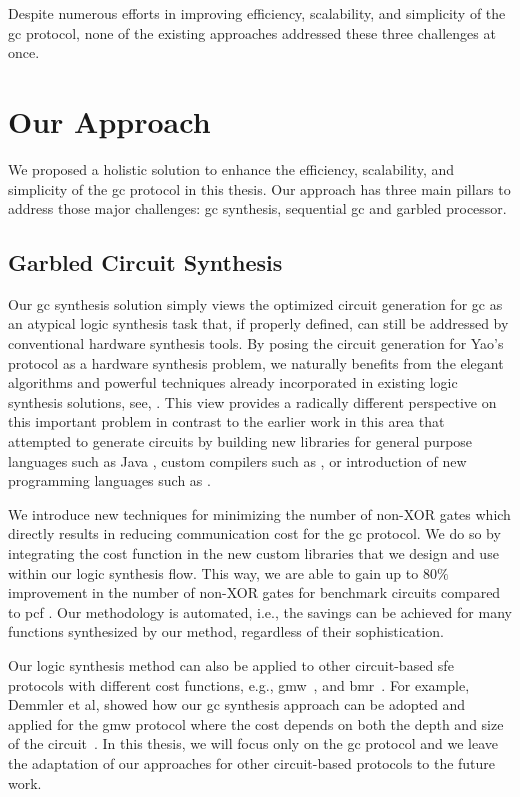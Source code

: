 Despite numerous efforts in improving efficiency, scalability, and simplicity of the \acrshort{gc} protocol, none of the existing approaches addressed these three challenges at once.

\section{Our Approach}
We proposed a holistic solution to enhance the efficiency, scalability, and simplicity of the \acrshort{gc} protocol in this thesis.
Our approach has three main pillars to address those major challenges: \acrlong{gc} synthesis, sequential \acrlong{gc} and garbled processor.

\subsection{Garbled Circuit Synthesis}
Our \acrfull{gc} synthesis solution simply views the optimized circuit generation for \acrshort{gc} as an atypical logic synthesis task that, if properly defined, can still be addressed by conventional hardware synthesis tools.
By posing the circuit generation for Yao's protocol as a hardware synthesis problem, we naturally benefits from the elegant algorithms and powerful techniques already incorporated in existing logic synthesis solutions, see, \cite{sentovich1992sis,micheli1994synthesis,devadas1994logic,brayton1987mis}.
This view provides a radically different perspective on this important problem in contrast to the earlier work in this area that attempted to generate circuits by building new libraries for general purpose languages such as Java \cite{huang2011faster,malka2011vmcrypt}, custom compilers such as \cite{kreuter2013pcf,franz2014cbmc}, or introduction of new programming languages such as \cite{malkhi2004fairplay,rastogi2014wysteria}.

We introduce new techniques for minimizing the number of non-XOR gates which directly results in reducing communication cost for the \acrshort{gc} protocol.
We do so by integrating the cost function in the new custom libraries that we design and use within our logic synthesis flow.
This way, we are able to gain up to $80\%$ improvement in the number of non-XOR gates for benchmark circuits compared to \gls{pcf} \cite{kreuter2013pcf}.
Our methodology is automated, i.e., the savings can be achieved for many functions synthesized by our method, regardless of their sophistication.

Our logic synthesis method can also be applied to other circuit-based \acrshort{sfe} protocols with different cost functions, e.g., \acrfull{gmw}~\cite{goldreich1987play}, and \acrfull{bmr}~\cite{beaver1990round}.
For example, Demmler et al, showed how our \acrshort{gc} synthesis approach can be adopted and applied for the \acrshort{gmw} protocol where the cost depends on both the depth and size of the circuit~\cite{demmler2015automated}.
In this thesis, we will focus only on the \acrshort{gc} protocol and we leave the adaptation of our approaches for other circuit-based protocols to the future work.

